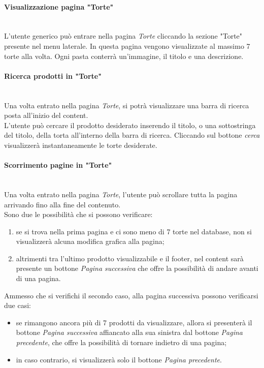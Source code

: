 \paragraph{Visualizzazione pagina "Torte"}\mbox{}\\
\label{par:VisTorte}
L'utente generico può entrare nella pagina \emph{Torte} cliccando la sezione "Torte" presente nel menu laterale.
In questa pagina vengono visualizzate al massimo 7 torte alla volta. Ogni pasta conterrà un'immagine, il titolo e una descrizione.\\

\paragraph{Ricerca prodotti in "Torte"}\mbox{}\\
\label{par:CerTorte}
Una volta entrato nella pagina \emph{Torte}, si potrà visualizzare una barra di ricerca posta all'inizio del content.\\
L'utente può cercare il prodotto desiderato inserendo il titolo, o una sottostringa del titolo, della torta all'interno della barra di ricerca. Cliccando sul bottone 
\emph{cerca} visualizzerà instantaneamente le torte desiderate.

\paragraph{Scorrimento pagine in "Torte"}\mbox{}\\
\label{par:PrevNextTorte}
Una volta entrato nella pagina \emph{Torte}, l'utente può scrollare tutta la pagina arrivando fino alla fine del contenuto.\\
Sono due le possibilità che si possono verificare:
\begin{enumerate}
	\item se si trova nella prima pagina e ci sono meno di 7 torte nel database, non si visualizzerà alcuna modifica grafica alla pagina;
	\item altrimenti tra l'ultimo prodotto visualizzabile e il footer, nel content sarà presente un bottone \emph{Pagina successiva} che offre la possibilità di andare avanti 
	di una pagina.
\end{enumerate}	
Ammesso che si verifichi il secondo caso, alla pagina successiva possono verificarsi due casi:
\begin{itemize}
	\item se rimangono ancora più di 7 prodotti da visualizzare, allora si presenterà il bottone \emph{Pagina successiva} affiancato alla sua sinistra dal 
	bottone \emph{Pagina precedente}, che offre la possibilità di tornare indietro di una pagina;
	\item in caso contrario, si visualizzerà solo il bottone \emph{Pagina precedente}.
\end{itemize}	


